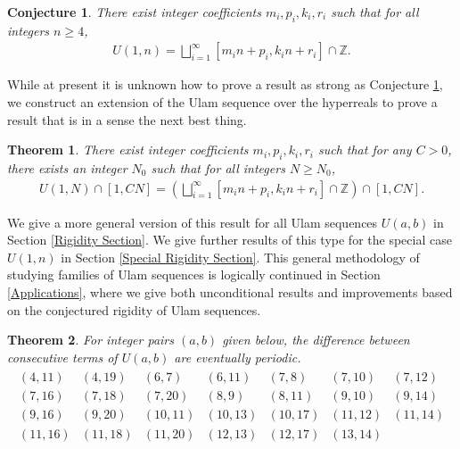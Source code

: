 \documentclass{amsart}
\newcommand{\ZZ}{\mathbb{Z}}
\theoremstyle{theorem}
\newtheorem{theorem}{Theorem}[section]
\newtheorem{conjecture}{Conjecture}[section]
\theoremstyle{definition}
\begin{document}
\begin{conjecture}\label{Conjecture That Started It All}
There exist integer coefficients $m_i, p_i, k_i, r_i$ such that for all integers $n \geq 4$,
	\begin{align*}
    U(1,n) = \bigsqcup_{i = 1}^\infty [m_i n + p_i, k_i n + r_i] \cap \ZZ.
    \end{align*}
\end{conjecture}

While at present it is unknown how to prove a result as strong as Conjecture \ref{Conjecture That Started It All}, we construct an extension of the Ulam sequence over the hyperreals to prove a result that is in a sense the next best thing.

\begin{theorem}
There exist integer coefficients $m_i, p_i, k_i, r_i$ such that for any $C > 0$, there exists an integer $N_0$ such that for all integers $N \geq N_0$,
	\begin{align*}
    U(1,N) \cap [1,CN] = \left(\bigsqcup_{i = 1}^\infty [m_i n + p_i, k_i n + r_i] \cap \ZZ\right) \cap [1,CN].
    \end{align*}
\end{theorem}

\noindent We give a more general version of this result for all Ulam sequences $U(a,b)$ in Section \ref{Rigidity Section}. We give further results of this type for the special case $U(1,n)$ in Section \ref{Special Rigidity Section}. This general methodology of studying families of Ulam sequences is logically continued in Section \ref{Applications}, where we give both unconditional results and improvements based on the conjectured rigidity of Ulam sequences.

\begin{theorem}
For integer pairs $(a,b)$ given below, the difference between consecutive terms of $U(a,b)$ are eventually periodic.
	\begin{align*}
    \begin{array}{lllllll}
    (4, 11) & (4, 19) & (6, 7) & (6, 11) & (7, 8) & (7, 10) & (7, 12) \\
    (7, 16) & (7, 18) & (7, 20) & (8, 9) & (8, 11) & (9, 10) & (9, 14) \\
    (9, 16) & (9, 20) & (10, 11) & (10, 13) & (10, 17) & (11, 12) & (11, 14) \\
    (11, 16) & (11, 18) & (11, 20) & (12, 13) & (12, 17) & (13, 14)
    \end{array}
    \end{align*}
\end{theorem}
\end{document}
